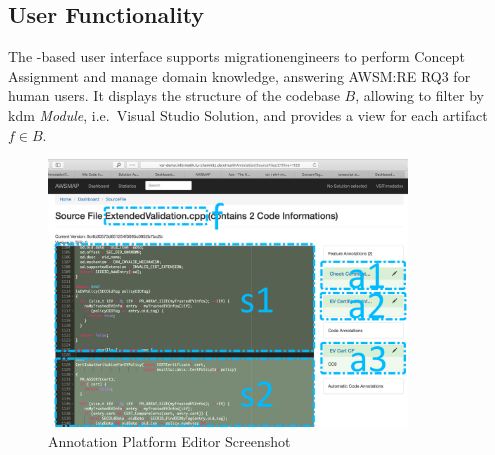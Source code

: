 \vspace{-35pt}
\hypertarget{sec:re.impl.features}{%
\subsection{User Functionality}\label{sec:re.impl.features}}
\vspace{10pt}

The -based user interface supports \glspl{migrationengineer} to perform \gls{Concept Assignment} and manage domain knowledge, answering AWSM:RE RQ3 for human users.
It displays the structure of the  codebase \(B\), allowing to filter by \gls{kdm} \emph{Module}, i.e.~Visual Studio Solution, and provides a view for each \gls{artifact} \(f \in B\).

\begin{figure}[h!]
\hypertarget{fig:awsmap.editor}{%
\centering
\includegraphics[width=0.85\textwidth]{../figures/screenshots/ap-editor3.png}
\caption{Annotation Platform Editor Screenshot}\label{fig:awsmap.editor}
}
\end{figure}
\vspace{-5pt}

